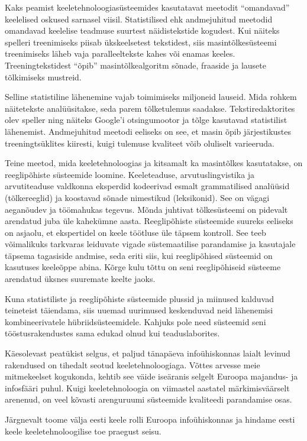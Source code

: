 \begin{multicols}{2}
Kaks peamist keeletehnoloogiasüsteemides kasutatavat meetodit ``omandavad'' keele\-lised oskused sarnasel viisil.  Statistilised ehk andmejuhitud meetodid omandavad keelelise teadmuse suurtest näidistekstide kogudest.  Kui näiteks spelleri treeni\-miseks piisab ükskeelsetest tekstidest, siis masintõlkesüsteemi treenimiseks läheb vaja paralleeltekste kahes või enamas keeles.  Treeningtekstidest ``õpib'' masintõlkealgoritm sõnade, fraaside ja lausete tõlkimiseks mustreid.

Selline statistiline lähenemine vajab toimi\-miseks miljoneid lauseid.  Mida rohkem näitetekste analüüsitakse, seda parem tõlketulemus saadakse.  Tekstiredaktorites olev speller ning näiteks Google’i otsingumootor ja tõlge kasutavad statistilist lähe\-ne\-mist.  Andmejuhitud meetodi eeliseks on see, et masin õpib järjestikustes treening\-tsüklites kiiresti, kuigi tulemuse kvaliteet võib oluliselt varieeruda.

Teine meetod, mida keeletehnoloogias ja kitsamalt ka masintõlkes kasutatakse, on reeglipõhiste süsteemide loomine.  Keele\-tea\-duse, arvutuslingvistika ja arvutitea\-duse valdkonna eksperdid kodeerivad esmalt grammatilised analüüsid (tõlke\-reeg\-lid) ja koostavad sõnade nimestikud (leksikonid).  See on vägagi aeganõudev ja töömahukas tegevus.  Mõnda juhtivat tõlkesüsteemi on pidevalt arendatud juba üle kahekümne aasta.  Reeglipõhiste süsteemide suureks eeliseks on asjaolu, et ekspertidel on keele töötluse üle täpsem kontroll.  See teeb võimalikuks tarkvaras leiduvate vigade süstemaatilise parandamise ja kasutajale täpsema tagasiside andmise, seda eriti siis, kui reeglipõhised süsteemid on kasutuses keeleõppe abina.  Kõrge kulu tõttu on seni reeglipõhiseid süsteeme arendatud üksnes suuremate keelte jaoks.



Kuna statistiliste ja reeglipõhiste süsteemide plussid ja miinused kalduvad teineteist täiendama, siis uuemad uurimused keskenduvad neid lähenemisi kombineerivatele hübriidsüsteemidele.  Kahjuks pole need süsteemid seni tööstusrakendustes sama edukad olnud kui teaduslaborites.

Käesolevast peatükist selgus, et paljud tänapäeva infoühiskonnas laialt levinud rakendused on tihedalt seotud keeletehnoloogiaga.  Võttes arvesse meie mitmekeelset kogukonda, kehtib see väide iseäranis selgelt Euroopa majandus- ja infosfääri puhul.  Kuigi keeletehnoloogia on viimastel aastatel märkimisväärselt arenenud, on veel kõvasti arenguruumi süsteemide kvaliteedi parandamise osas.

Järgnevalt toome välja eesti keele rolli Euroopa infoühiskonnas ja hindame eesti keele keeletehnoloogilise toe praegust seisu.  
\end{multicols}

